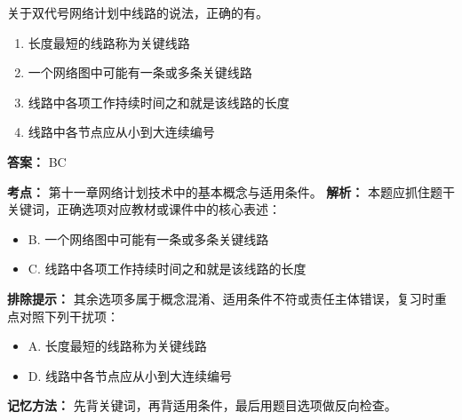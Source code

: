 \documentclass[UTF8,fontset=fandol,11pt]{ctexart}
\begin{document}
\begin{quizbox}[title={第 12 题}]
关于双代号网络计划中线路的说法，正确的有。\\
\begin{enumerate}[label=\Alph*.]
\item 长度最短的线路称为关键线路
\item 一个网络图中可能有一条或多条关键线路
\item 线路中各项工作持续时间之和就是该线路的长度
\item 线路中各节点应从小到大连续编号
\end{enumerate}
\textbf{答案：} BC
\vspace{0.25em}
\begin{answerbox}[title={考点解析}]
\textbf{考点：} 第十一章网络计划技术中的基本概念与适用条件。
\textbf{解析：} 本题应抓住题干关键词，正确选项对应教材或课件中的核心表述：
\begin{itemize}
\item B. 一个网络图中可能有一条或多条关键线路
\item C. 线路中各项工作持续时间之和就是该线路的长度
\end{itemize}
\textbf{排除提示：} 其余选项多属于概念混淆、适用条件不符或责任主体错误，复习时重点对照下列干扰项：
\begin{itemize}
\item A. 长度最短的线路称为关键线路
\item D. 线路中各节点应从小到大连续编号
\end{itemize}
\textbf{记忆方法：} 先背关键词，再背适用条件，最后用题目选项做反向检查。
\end{answerbox}
\end{quizbox}

\vspace{0.2em}
\end{document}

